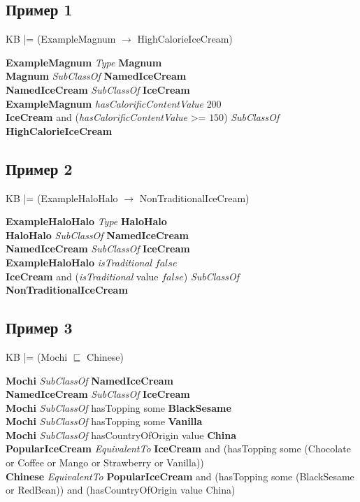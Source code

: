 \documentclass[12pt]{article}
\newcommand*{\MyIndent}{\hspace*{7em}}
\begin{document}
\subsection{Пример 1}

KB |= (ExampleMagnum $\rightarrow$ HighCalorieIceCream)

\vspace{1em}

\textbf{ExampleMagnum} \textit{Type} \textbf{Magnum} \\
\MyIndent \textbf{Magnum} \textit{SubClassOf} \textbf{NamedIceCream} \\
\MyIndent \MyIndent \textbf{NamedIceCream} \textit{SubClassOf} \textbf{IceCream} \\
\textbf{ExampleMagnum} \textit{hasCalorificContentValue} $200$ \\
\textbf{IceCream} and (\textit{hasCalorificContentValue} >= $150$) \textit{SubClassOf} \textbf{HighCalorieIceCream}

\subsection{Пример 2}

KB |= (ExampleHaloHalo $\rightarrow$ NonTraditionalIceCream)

\vspace{1em}

\textbf{ExampleHaloHalo} \textit{Type} \textbf{HaloHalo} \\
\MyIndent \textbf{HaloHalo} \textit{SubClassOf} \textbf{NamedIceCream} \\
\MyIndent \MyIndent \textbf{NamedIceCream} \textit{SubClassOf} \textbf{IceCream} \\
\textbf{ExampleHaloHalo} \textit{isTraditional} $false$ \\
\textbf{IceCream} and (\textit{isTraditional} value $false$) \textit{SubClassOf} \textbf{NonTraditionalIceCream}

\subsection{Пример 3}

KB |= (Mochi $\sqsubseteq$ Chinese)

\vspace{1em}

\textbf{Mochi} \textit{SubClassOf} \textbf{NamedIceCream} \\
\MyIndent \textbf{NamedIceCream} \textit{SubClassOf} \textbf{IceCream} \\
\textbf{Mochi} \textit{SubClassOf} hasTopping some \textbf{BlackSesame} \\
\textbf{Mochi} \textit{SubClassOf} hasTopping some \textbf{Vanilla} \\
\textbf{Mochi} \textit{SubClassOf} hasCountryOfOrigin value \textbf{China} \\
\textbf{PopularIceCream} \textit{EquivalentTo} \textbf{IceCream} and (hasTopping some (Chocolate or Coffee or Mango or Strawberry or Vanilla)) \\
\textbf{Chinese} \textit{EquivalentTo} \textbf{PopularIceCream} and (hasTopping some (BlackSesame or RedBean)) and (hasCountryOfOrigin value China)
\end{document}
